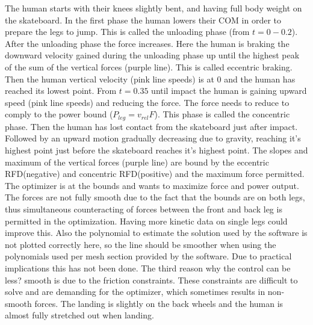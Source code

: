 The human starts with their knees slightly bent, and having full body weight on the skateboard. In the first phase the human lowers their COM in order to prepare the legs to jump. This is called the unloading phase (from $t=0 - 0.2$). After the unloading phase the force increases. Here the human is braking the downward velocity gained during the unloading phase up until the highest peak of the sum of the vertical forces (purple line). This is called eccentric braking. Then the human vertical velocity (pink line speeds) is at 0 and the human has reached its lowest point. From $t=0.35$ until impact the human is gaining upward speed  (pink line speeds) and reducing the force. The force needs to reduce to comply to the power bound ($P_{leg} = v_{rel} F$). This phase is called the concentric phase. Then the human has lost contact from the skateboard just after impact. Followed by an upward motion gradually decreasing due to gravity, reaching it's highest point just before the skateboard reaches it's highest point. The slopes and maximum of the vertical forces (purple line) are bound by the eccentric RFD(negative) and concentric RFD(positive) and the maximum force permitted. The optimizer is at the bounds and wants to maximize force and power output. The forces are not fully smooth due to the fact that the bounds are on both legs, thus simultaneous counteracting of forces between the front and back leg is permitted in the optimization. Having more kinetic data on single legs could improve this. Also the polynomial to estimate the solution used by the software is not plotted correctly here, so the line should be smoother when using the polynomials used per mesh section provided by the software. Due to practical implications this has not been done. The third reason why the control can be less? smooth is due to the friction constraints. These constraints are difficult to solve and are demanding for the optimizer, which sometimes results in non-smooth forces.
The landing is slightly on the back wheels and the human is almost fully stretched out when landing.

\newpage
